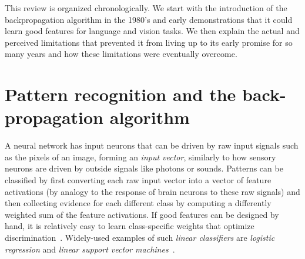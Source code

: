 \documentclass[10pts]{article}
\begin{document}
This review is organized chronologically. We start with the introduction of
the backpropagation algorithm in the 1980's and early demonstrations
that it could learn good features for language and vision tasks.  We
then explain the actual and perceived limitations that
prevented it from living up to its early promise for so many years and how
these limitations were eventually overcome. 

\section{Pattern recognition and the back-propagation algorithm}

A neural network has input neurons that can be driven by raw input
signals such as the pixels of an image, forming an {\em input vector},
similarly to how sensory neurons are driven by outside signals like photons or sounds.
Patterns can be classified by first converting each raw input vector into a
vector of feature activations (by analogy to the response of brain neurons
to these raw signals) and then collecting evidence for each
different class by computing a differently weighted sum of the feature
activations. If good
features can be designed by hand, it is relatively easy to learn
class-specific weights that optimize
discrimination~\citep{Rosenblatt57}. Widely-used examples of such {\em linear
classifiers} are {\em logistic regression} and {\em linear support vector
machines}~\citep{bishop-book95,Boser92}.
\end{document}
